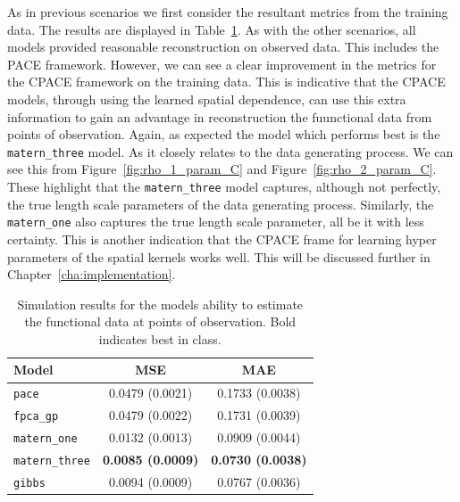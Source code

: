 As in previous scenarios we first consider the resultant metrics from the training data.
The results are displayed in Table~\ref{tab:train_C}.
As with the other scenarios, all models provided reasonable reconstruction on observed data.
This includes the PACE framework.
However, we can see a clear improvement in the metrics for the CPACE framework on the training data.
This is indicative that the CPACE models, through using the learned spatial dependence, can use this extra information to gain an advantage in reconstruction the fuunctional data from points of observation.
Again, as expected the model which performs best is the \verb*|matern_three| model.
As it closely relates to the data generating process. 
We can see this from Figure~\ref{fig:rho_1_param_C} and Figure~\ref{fig:rho_2_param_C}. 
These highlight that the \verb*|matern_three| model captures, although not perfectly, the true length scale parameters of the data generating process.
Similarly, the \verb*|matern_one| also captures the true length scale parameter, all be it with less certainty.
This is another indication that the CPACE frame for learning hyper parameters of the spatial kernels works well. 
This will be discussed further in Chapter~\ref{cha:implementation}.

\begin{table}
	\caption[Simulation results for Scenario C on observed data]{Simulation results for the models ability to estimate the functional data at points of observation. Bold indicates best in class.}
	\centering
	\label{tab:train_C}
	\begin{tabular}{lcc}
		\toprule
		\textbf{Model} & \textbf{MSE} & \textbf{MAE} \\
		\midrule
		\verb*|pace| & 0.0479 (0.0021)& 0.1733	(0.0038)\\
		\verb*|fpca_gp| & 0.0479 (0.0022) & 0.1731	(0.0039) \\
		\verb*|matern_one| & 0.0132	(0.0013) & 0.0909 (0.0044) \\
		\verb*|matern_three| & \textbf{0.0085 (0.0009)} & \textbf{ 0.0730	(0.0038)} \\
		\verb*|gibbs| & 0.0094	(0.0009) & 0.0767 (0.0036)\\
		\bottomrule
	\end{tabular}
\end{table}


